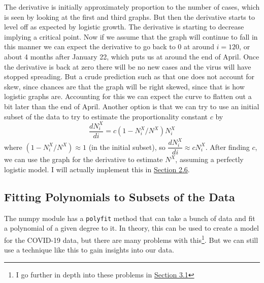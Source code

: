 \documentclass{report}
\begin{document}
            The derivative is initially approximately proportion to the number of cases, which is seen by looking at the first and third graphs. But then the derivative starts to level off as expected by logistic growth. The derivative is starting to decrease implying a critical point. Now if we assume that the graph will continue to fall in this manner we can expect the derivative to go back to 0 at around $i=120$, or about 4 months after January 22, which puts us at around the end of April. Once the derivative is back at zero there will be no new cases and the virus will have stopped spreading. But a crude prediction such as that one does not account for skew, since chances are that the graph will be right skewed, since that is how logistic graphs are. Accounting for this we can expect the curve to flatten out a bit later than the end of April. 
            \newline
            \indent Another option is that we can try to use an initial subset of the data to try to estimate the proportionality constant $c$ by
            \begin{equation}
                \dfrac{dN^X_i}{di} = c(1 - N^X_i/N^X)N^X_i
            \end{equation}
            where $(1 - N^X_i/N^X) \approx 1$ (in the initial subset), so $\dfrac{dN^X_i}{di} \approx cN^X_i$. After finding $c$, we can use the graph for the derivative to estimate $N^X$, assuming a perfectly logistic model. I will actually implement this in \hyperref[sec:auto]{Section 2.6}.
        \subsection{Fitting Polynomials to Subsets of the Data}
            The numpy module has a \lstinline{polyfit} method that can take a bunch of data and fit a polynomial of a given degree to it. In theory, this can be used to create a model for the COVID-19 data, but there are many problems with this\footnote{I go further in depth into these problems in \hyperref[sec:problems]{Section 3.1}}. But we can still use a technique like this to gain insights into our data.
\end{document}
